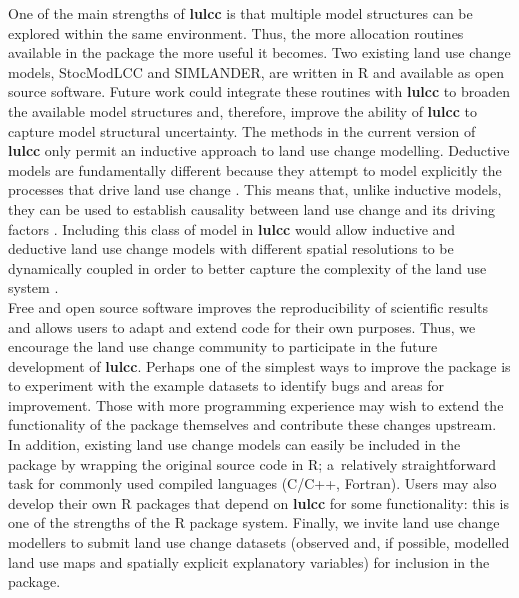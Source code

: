 \documentclass[gmdd, online, hvmath]{copernicus}
\begin{document}
One of the main strengths of \textbf{lulcc} is that multiple model structures can be explored within the same environment. Thus, the more allocation routines available in the package the more useful it becomes. Two existing land use change models, StocModLCC and SIMLANDER, are written in R and available as open source software. Future work could integrate these routines with \textbf{lulcc} to broaden the available model structures and, therefore, improve the ability of \textbf{lulcc} to capture model structural uncertainty. The methods in the current version of \textbf{lulcc} only permit an inductive approach to land use change modelling. Deductive models are fundamentally different because they attempt to model explicitly the processes that drive land use change \citep{perez-vega2012}. This means that, unlike inductive models, they can be used to establish causality between land use change and its driving factors \citep{overmars2007}. Including this class of model in \textbf{lulcc} would allow inductive and deductive land use change models with different spatial resolutions to be dynamically coupled in order to better capture the complexity of the land use system \citep{moreira2009}. \\

Free and open source software improves the reproducibility of scientific results and allows users to adapt and extend code for their own purposes. Thus, we encourage the land use change community to participate in the future development of \textbf{lulcc}. Perhaps one of the simplest ways to improve the package is to experiment with the example datasets to identify bugs and areas for improvement. Those with more programming experience may wish to extend the functionality of the package themselves and contribute these changes upstream. In addition, existing land use change models can easily be included in the package by wrapping the original source code in R; a~relatively straightforward task for commonly used compiled languages (C/C++, Fortran). Users may also develop their own R packages that depend on \textbf{lulcc} for some functionality: this is one of the strengths of the R package system. Finally, we invite land use change modellers to submit land use change datasets (observed and, if possible, modelled land use maps and spatially explicit explanatory variables) for inclusion in the package. \\
\end{document}
